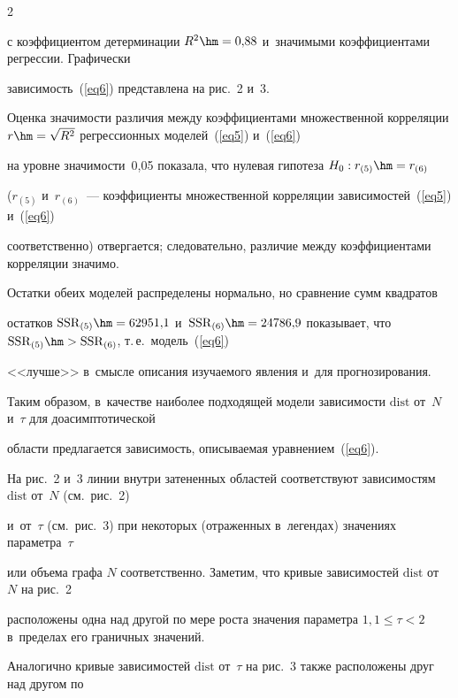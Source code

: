 \begin{multicols}{2}
\begin{equation}
\end{equation}

с коэффициентом детерминации $R^2\hm=0{,}88$ и~значимыми коэффициентами регрессии. Графически

за\-ви\-си\-мость~(\ref{eq6}) пред\-став\-ле\-на на рис.~2 и~3.



Оценка значимости различия между коэффициентами множественной корреляции $r\hm=\sqrt{R^2}$ регрессионных моделей~(\ref{eq5}) и~(\ref{eq6})

 на уровне зна\-чи\-мости~0,05 показала, что нулевая гипотеза $H_0:\linebreak r_{(5)}\hm=r_{(6)}$

($r_{(5)}$ и~$r_{(6)}$~--- коэффициенты множественной корреляции зависимостей~(\ref{eq5}) и~(\ref{eq6})

соответственно) отвергается; следовательно, различие между коэффициентами корреляции значимо.

Остатки обеих моделей распределены нормально, но сравнение сумм квад\-ра\-тов

остатков $\mathrm{SSR}_{(5)}\hm=62951{,}1$ и~$\mathrm{SSR}_{(6)}\hm=24786{,}9$ показывает, что $\mathrm{SSR}_{(5)}\hm>\mathrm{SSR}_{(6)}$, т.\,е.\ модель~(\ref{eq6}) 

<<лучше>> в~смыс\-ле описания изуча\-емо\-го явления и~для прогнозирования.

Таким образом, в~качестве наиболее под\-хо\-дя\-щей модели за\-ви\-си\-мости $\mathrm{dist}$ от~$N$ и~$\tau$ для до\-асимп\-то\-ти\-че\-ской

об\-ласти предлагается за\-ви\-си\-мость, описываемая уравнением~(\ref{eq6}).







На рис.~2 и~3 линии внут\-ри затененных областей соответствуют зависимостям $\mathrm{dist}$ от~$N$ (см.\ рис.~2)

и~от~$\tau$ (см.\ рис.~3) при некоторых (отраженных в~легендах) значениях па\-ра\-мет\-ра~$\tau$

или объема графа $N$ соответственно. Заметим, что кривые зависимостей $\mathrm{dist}$ от~$N$ на рис.~2

расположены одна над другой по мере роста значения параметра $1,1\leq\tau<2$ в~пределах его граничных значений.

Аналогично кривые зависимостей $\mathrm{dist}$ от~$\tau$ на рис.~3 также расположены друг над другом по


\end{multicols}
